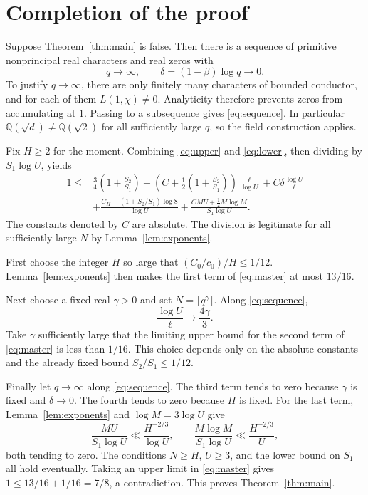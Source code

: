 \documentclass[11pt,a4paper]{amsart}
\theoremstyle{remark}
\newcommand{\Q}{\mathbb Q}
\numberwithin{equation}{section}
\begin{document}
\section{Completion of the proof}\label{sec:conclusion}

Suppose Theorem~\ref{thm:main} is false. Then there is a sequence
of primitive nonprincipal real characters and real zeros with
\begin{equation}\label{eq:sequence}
 q\longrightarrow\infty,\qquad
 \delta=(1-\beta)\log q\longrightarrow0.
\end{equation}
To justify $q\to\infty$, there are only finitely many characters
of bounded conductor, and for each of them $L(1,\chi)\ne0$.
Analyticity therefore prevents zeros from accumulating at $1$.
Passing to a subsequence gives \eqref{eq:sequence}. In particular
$\Q(\sqrt d)\ne\Q(\sqrt2)$ for all sufficiently large $q$, so
the field construction applies.

Fix $H\ge2$ for the moment. Combining \eqref{eq:upper} and
\eqref{eq:lower}, then dividing by $S_1\log U$, yields
\begin{equation}\label{eq:master}
\begin{split}
 1\le{}&\frac34\left(1+\frac{S_2}{S_1}\right)
 +\left(C+\frac12\left(1+\frac{S_2}{S_1}\right)\right)
          \frac{\ell}{\log U}
 +C\delta\frac{\log U}{\ell}\\
 &+\frac{C_H+(1+S_2/S_1)\log8}{\log U}
 +\frac{CMU+\tfrac12 M\log M}{S_1\log U}.
\end{split}
\end{equation}
The constants denoted by $C$ are absolute. The division is legitimate
for all sufficiently large $N$ by Lemma~\ref{lem:exponents}.

First choose the integer $H$ so large that
$(C_0/c_0)/H\le1/12$. Lemma~\ref{lem:exponents} then makes the
first term of \eqref{eq:master} at most $13/16$.

Next choose a fixed real $\gamma>0$ and set
$N=\lceil q^\gamma\rceil$. Along \eqref{eq:sequence},
\[
 \frac{\log U}{\ell}\longrightarrow\frac{4\gamma}{3}.
\]
Take $\gamma$ sufficiently large that the limiting upper bound
for the second term of \eqref{eq:master} is less than $1/16$.
This choice depends only on the absolute constants and the already
fixed bound $S_2/S_1\le1/12$.

Finally let $q\to\infty$ along \eqref{eq:sequence}. The third term
tends to zero because $\gamma$ is fixed and $\delta\to0$.
The fourth tends to zero because $H$ is fixed. For the last term,
Lemma~\ref{lem:exponents} and $\log M=3\log U$ give
\[
 \frac{MU}{S_1\log U}\ll\frac{H^{-2/3}}{\log U},
 \qquad
 \frac{M\log M}{S_1\log U}\ll\frac{H^{-2/3}}{U},
\]
both tending to zero. The conditions $N\ge H$, $U\ge3$, and
the lower bound on $S_1$ all hold eventually. Taking an upper limit
in \eqref{eq:master} gives $1\le13/16+1/16=7/8$, a contradiction.
This proves Theorem~\ref{thm:main}.
\end{document}
